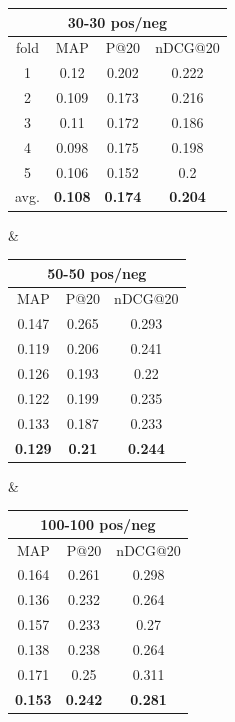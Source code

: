 \begin{adjustbox}{center, tabular=ccc, caption={DRMM runs (count-based histograms), IDF weighting, stemmed with stopwords removal}, nofloat=table}
\centering
\begin{tabular}{c|ccc}
\hline
\multicolumn{4}{c}{30-30 pos/neg} \\ \hline
fold & MAP & P@20 & nDCG@20 \\ \hline
1 & 0.12 & 0.202 & 0.222 \\
2 & 0.109 & 0.173 & 0.216 \\
3 & 0.11 & 0.172 & 0.186 \\
4 & 0.098 & 0.175 & 0.198 \\
5 & 0.106 & 0.152 & 0.2 \\ \hline
avg. & \textbf{0.108} & \textbf{0.174} & \textbf{0.204} \\
\hline
\end{tabular} &
\begin{tabular}{ccc}
\hline
\multicolumn{3}{c}{50-50 pos/neg} \\ \hline
MAP & P@20 & nDCG@20 \\ \hline
0.147 & 0.265 & 0.293 \\
0.119 & 0.206 & 0.241 \\
0.126 & 0.193 & 0.22 \\
0.122 & 0.199 & 0.235 \\
0.133 & 0.187 & 0.233 \\ \hline
\textbf{0.129} & \textbf{0.21} & \textbf{0.244} \\
\hline
\end{tabular} &
\begin{tabular}{ccc}
\hline
\multicolumn{3}{c}{100-100 pos/neg} \\ \hline
MAP & P@20 & nDCG@20 \\ \hline
0.164 & 0.261 & 0.298 \\
0.136 & 0.232 & 0.264 \\
0.157 & 0.233 & 0.27 \\
0.138 & 0.238 & 0.264 \\
0.171 & 0.25 & 0.311 \\ \hline
\textbf{0.153} & \textbf{0.242} & \textbf{0.281} \\
\hline
\end{tabular}
\label{tab:chsamp}
\end{adjustbox}

